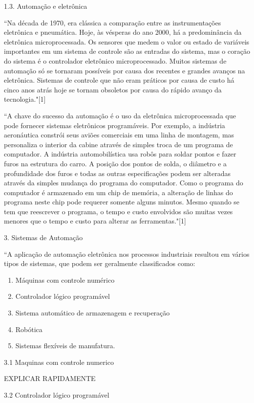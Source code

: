 \documentclass[a4paper, 12pt]{article}
\begin{document}
1.3. Automação e eletrônica

``Na década de 1970, era clássica a comparação entre as instrumentações
eletrônica e pneumática. Hoje, às vésperas do ano 2000, há a predominância da
eletrônica microprocessada.
Os sensores que medem o valor ou estado de variáveis importantes em um
sistema de controle são as entradas do sistema, mas o coração do sistema é o
controlador eletrônico microprocessado. Muitos sistemas de automação só se
tornaram possíveis por causa dos recentes e grandes avanços na eletrônica. 
Sistemas de controle que não eram práticos por causa de custo há cinco anos 
atrás hoje se tornam obsoletos por causa do rápido avanço da tecnologia."[1]

``A chave do sucesso da automação é o uso da eletrônica microprocessada que
pode fornecer sistemas eletrônicos programáveis. Por exemplo, a indústria
aeronáutica constrói seus aviões comerciais em uma linha de montagem,
mas personaliza o interior da cabine através de simples troca de um programa
de computador. A indústria automobilística usa robôs para soldar pontos e 
fazer furos na estrutura do carro. A posição dos pontos de solda, o diâmetro
e a profundidade dos furos e todas as outras especificações podem ser alteradas
através da simples mudança do programa do computador. Como o programa do 
computador é armazenado em um chip de memória, a alteração de linhas do programa
neste chip pode requerer somente alguns minutos. Mesmo quando se tem que 
reescrever o programa, o tempo e custo envolvidos são muitas vezes menores que o
tempo e custo para alterar as ferramentas."[1]

3. Sistemas de Automação

``A aplicação de automação eletrônica nos processos industriais resultou em
vários tipos de sistemas, que podem ser geralmente classificados como:
\begin{enumerate}
	\item Máquinas com controle numérico
	\item Controlador lógico programável
	\item Sistema automático de armazenagem e recuperação
	\item Robótica
	\item Sistemas flexíveis de manufatura.
\end{enumerate}

3.1 Maquinas com controle numerico

EXPLICAR RAPIDAMENTE

3.2 Controlador lógico programável
\end{document}
